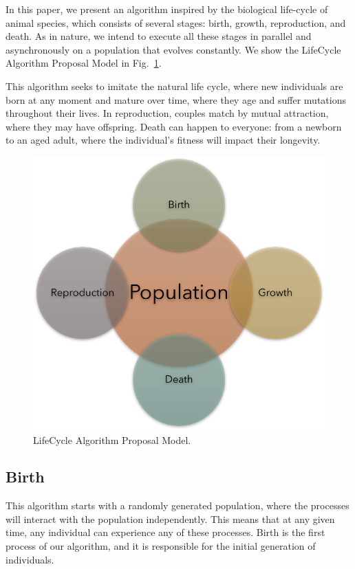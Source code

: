 \documentclass[runningheads]{llncs}
\begin{document}
In this paper, we present an algorithm inspired by the biological life-cycle of
animal species, which consists of several stages: birth, growth, reproduction,
and death. As in nature, we intend to execute all these stages in parallel and
asynchronously on a population that evolves constantly. We show the LifeCycle 
Algorithm Proposal Model in Fig.~\ref{fig2}.

This algorithm seeks to imitate the natural life cycle, where new individuals
are born at any moment and mature over time, where they age and suffer
mutations throughout their lives. In reproduction, couples match by mutual
attraction, where they may have offspring. Death can happen to everyone: from a
newborn to an aged adult, where the individual's fitness will impact their
longevity.

\begin{figure}
    \includegraphics[width=\textwidth]{img/fig2_proposal.pdf}
    \caption{LifeCycle Algorithm Proposal Model.} \label{fig2}
    \end{figure}

\subsection{Birth}

This algorithm starts with a randomly generated population, where the processes
will interact with the population independently. This means that at any given
time, any individual can experience any of these processes. Birth is the first
process of our algorithm, and it is responsible for the initial generation of
individuals.
\end{document}
